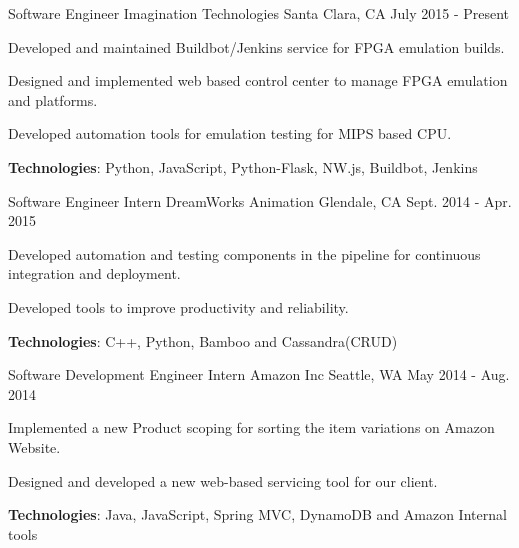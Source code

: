 \begin{cventries}
  \cventry
    {Software Engineer}
    {Imagination Technologies}
    {Santa Clara, CA}
    {July 2015 - Present}
    {
      \begin{cvitems}
        \item {Developed and maintained Buildbot/Jenkins service for FPGA emulation builds.}
        \item {Designed and implemented web based control center to manage FPGA emulation and platforms.}
        \item {Developed automation tools for emulation testing for MIPS based CPU.}                
        \item {\textbf{Technologies}: Python, JavaScript, Python-Flask, NW.js, Buildbot, Jenkins}
      \end{cvitems}
    }
  \cventry
    {Software Engineer Intern}
    {DreamWorks Animation}
    {Glendale, CA}
    {Sept. 2014 - Apr. 2015}
    {
      \begin{cvitems}
        \item {Developed automation and testing components in the pipeline for continuous integration and deployment.}
        \item {Developed tools to improve productivity and reliability.}
        \item {\textbf{Technologies}: C++, Python, Bamboo and Cassandra(CRUD)}
      \end{cvitems}
    }
  \cventry
    {Software Development Engineer Intern}
    {Amazon Inc}
    {Seattle, WA}
    {May 2014 - Aug. 2014}
    {
      \begin{cvitems}
        \item {Implemented a new Product scoping for sorting the item variations on Amazon Website.}
        \item {Designed and developed a new web-based servicing tool for our client.}
        \item {\textbf{Technologies}: Java, JavaScript, Spring MVC, DynamoDB and Amazon Internal tools}
      \end{cvitems} 
    }
    
\end{cventries}
